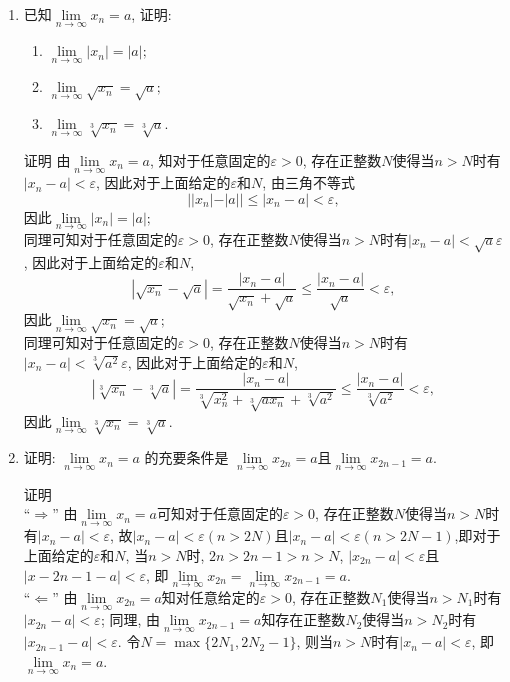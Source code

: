 \documentclass[UTF8,a4paper,20pt]{article}
\begin{document}
\begin{enumerate}
\item {\large\kaishu 已知$\lim\limits_{n\to \infty}x_n=a$, 证明:}
	\begin{enumerate}[(1)]
	\item $\lim\limits_{n \to \infty}|x_n|=|a|;$
	\item $\lim\limits_{n \to \infty}\sqrt{x_n}=\sqrt{a};$
	\item $\lim\limits_{n \to \infty}\sqrt[3]{x_n}=\sqrt[3]{a}.$
	\end{enumerate}

{\heiti 证明}
由$\lim\limits_{n\to \infty}x_n=a$, 知对于任意固定的$\varepsilon>0$, 存在正整数$N$使得当$n>N$时有$|x_n-a|<\varepsilon$, 因此对于上面给定的$\varepsilon$和$N$, 由三角不等式
\[
||x_n|-|a||\leqslant|x_n-a|<\varepsilon,
\]
因此$\lim\limits_{n \to \infty}|x_n|=|a|;$\\
同理可知对于任意固定的$\varepsilon>0$, 存在正整数$N$使得当$n>N$时有$|x_n-a|<\sqrt{a}\varepsilon$, 因此对于上面给定的$\varepsilon$和$N$, 
\[
|\sqrt{x_n}-\sqrt{a}|=\dfrac{|x_n-a|}{\sqrt{x_n}+\sqrt{a}}\leqslant\dfrac{|x_n-a|}{\sqrt{a}}<\varepsilon,
\]
因此$\lim\limits_{n \to \infty}\sqrt{x_n}=\sqrt{a};$\\
同理可知对于任意固定的$\varepsilon>0$, 存在正整数$N$使得当$n>N$时有$|x_n-a|<\sqrt[3]{a^2}\varepsilon$, 因此对于上面给定的$\varepsilon$和$N$, 
\[
|\sqrt[3]{x_n}-\sqrt[3]{a}|=\dfrac{|x_n-a|}{\sqrt[3]{x_n^2}+\sqrt[3]{ax_n}+\sqrt[3]{a^2}}\leqslant\dfrac{|x_n-a|}{\sqrt[3]{a^2}}<\varepsilon,
\]
因此$\lim\limits_{n \to \infty}\sqrt[3]{x_n}=\sqrt[3]{a}.$

\item {\large\kaishu 证明: $\lim\limits_{n \to \infty} x_n=a$ 的充要条件是 $\lim\limits_{n \to \infty}x_{2n}=a$且$\lim\limits_{n \to \infty}x_{2n-1}=a$.}

{\heiti 证明}\\
``$\Rightarrow$''  由$\lim\limits_{n \to \infty} x_n=a$可知对于任意固定的$\varepsilon>0$, 存在正整数$N$使得当$n>N$时有$|x_n-a|<\varepsilon$, 故$|x_n-a|<\varepsilon(n>2N)$且$|x_n-a|<\varepsilon(n>2N-1)$,即对于上面给定的$\varepsilon$和$N$, 当$n>N$时, $2n>2n-1>n>N$, $|x_{2n}-a|<\varepsilon$且$|x-{2n-1}-a|<\varepsilon$, 即$\lim\limits_{n \to \infty}x_{2n}=\lim\limits_{n \to \infty}x_{2n-1}=a.$\\
``$\Leftarrow$''   由$\lim\limits_{n \to \infty}x_{2n}=a$知对任意给定的$\varepsilon>0$, 存在正整数$N_1$使得当$n>N_1$时有$|x_{2n}-a|<\varepsilon$; 同理, 由$\lim\limits_{n \to \infty}x_{2n-1}=a$知存在正整数$N_2$使得当$n>N_2$时有$|x_{2n-1}-a|<\varepsilon$. 令$N=\max\{2N_1, 2N_2-1\}$, 则当$n>N$时有$|x_n-a|<\varepsilon$, 即$\lim\limits_{n \to \infty} x_n=a$. 


\end{enumerate}
\end{document}
